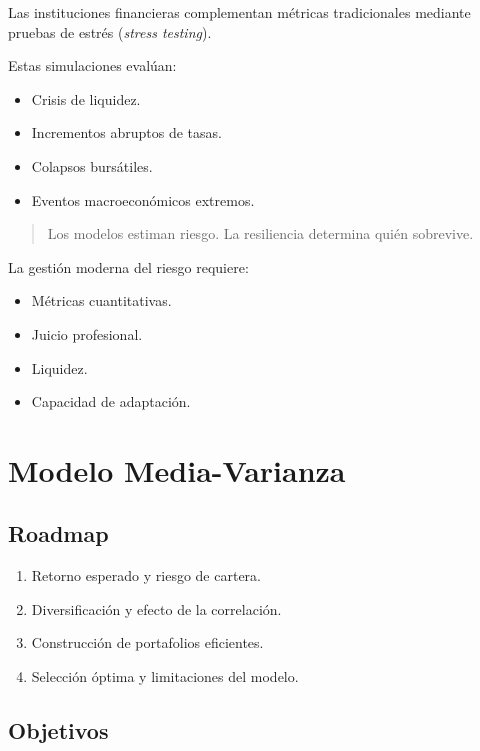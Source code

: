 Las instituciones financieras complementan métricas tradicionales mediante pruebas de estrés (\textit{stress testing}).

Estas simulaciones evalúan:

\begin{itemize}
    \item Crisis de liquidez.
    \item Incrementos abruptos de tasas.
    \item Colapsos bursátiles.
    \item Eventos macroeconómicos extremos.
\end{itemize}

\begin{quote}
Los modelos estiman riesgo. La resiliencia determina quién sobrevive.
\end{quote}

La gestión moderna del riesgo requiere:

\begin{itemize}
    \item Métricas cuantitativas.
    \item Juicio profesional.
    \item Liquidez.
    \item Capacidad de adaptación.
\end{itemize}

\section{Modelo Media-Varianza}

\subsection{Roadmap}

\begin{enumerate}
    \item Retorno esperado y riesgo de cartera.
    \item Diversificación y efecto de la correlación.
    \item Construcción de portafolios eficientes.
    \item Selección óptima y limitaciones del modelo.
\end{enumerate}

\subsection{Objetivos}


